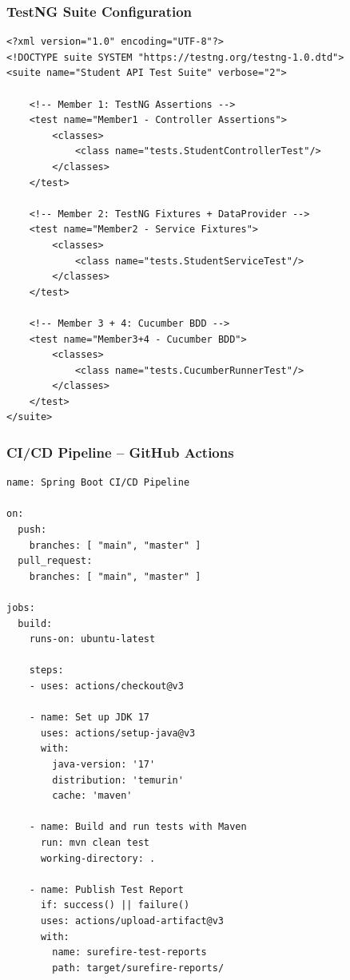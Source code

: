 \documentclass[12pt,a4paper]{article}
\begin{document}
\subsubsection{TestNG Suite Configuration}

\begin{lstlisting}[style=xmlstyle, caption={\texttt{testng.xml} -- Orchestrating all test groups}]
<?xml version="1.0" encoding="UTF-8"?>
<!DOCTYPE suite SYSTEM "https://testng.org/testng-1.0.dtd">
<suite name="Student API Test Suite" verbose="2">

    <!-- Member 1: TestNG Assertions -->
    <test name="Member1 - Controller Assertions">
        <classes>
            <class name="tests.StudentControllerTest"/>
        </classes>
    </test>

    <!-- Member 2: TestNG Fixtures + DataProvider -->
    <test name="Member2 - Service Fixtures">
        <classes>
            <class name="tests.StudentServiceTest"/>
        </classes>
    </test>

    <!-- Member 3 + 4: Cucumber BDD -->
    <test name="Member3+4 - Cucumber BDD">
        <classes>
            <class name="tests.CucumberRunnerTest"/>
        </classes>
    </test>
</suite>
\end{lstlisting}

\subsubsection{CI/CD Pipeline -- GitHub Actions}

\begin{lstlisting}[style=yamlstyle, caption={\texttt{test.yml} -- GitHub Actions CI/CD workflow}]
name: Spring Boot CI/CD Pipeline

on:
  push:
    branches: [ "main", "master" ]
  pull_request:
    branches: [ "main", "master" ]

jobs:
  build:
    runs-on: ubuntu-latest

    steps:
    - uses: actions/checkout@v3

    - name: Set up JDK 17
      uses: actions/setup-java@v3
      with:
        java-version: '17'
        distribution: 'temurin'
        cache: 'maven'

    - name: Build and run tests with Maven
      run: mvn clean test
      working-directory: .

    - name: Publish Test Report
      if: success() || failure()
      uses: actions/upload-artifact@v3
      with:
        name: surefire-test-reports
        path: target/surefire-reports/
\end{lstlisting}
\end{document}
